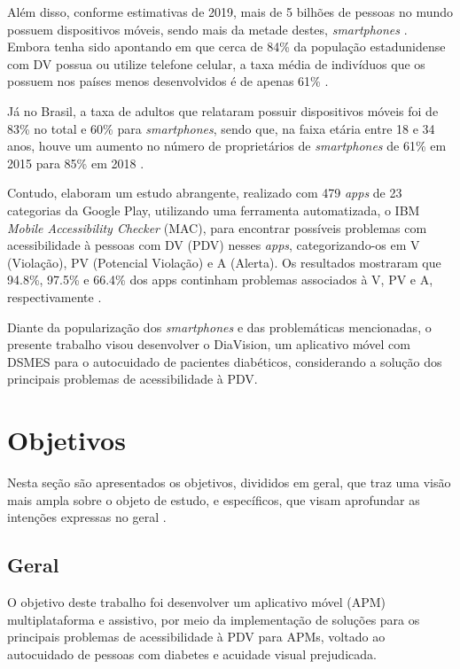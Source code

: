 Além disso, conforme estimativas de 2019, mais de 5 bilhões de pessoas no mundo possuem dispositivos móveis, sendo mais da metade destes, \textit{smartphones}
\cite{Taylor2019}. Embora tenha sido apontando em  que cerca de 84\% da população estadunidense com DV possua ou utilize
telefone celular, a taxa média de indivíduos que os possuem nos países menos desenvolvidos é de apenas 61\% \cite{ITU_2021}.

Já no Brasil, a taxa de adultos que relataram possuir dispositivos móveis foi de 83\% no total e 60\% para \textit{smartphones},
sendo que, na faixa etária entre 18 e 34 anos, houve um aumento no número de proprietários de \textit{smartphones} de
61\% em 2015 para 85\% em 2018 \cite{Taylor2019}.

Contudo,  elaboram um estudo abrangente, realizado com 479 \textit{apps} de 23 categorias da
Google Play, utilizando uma ferramenta automatizada, o IBM \textit{Mobile Accessibility Checker}
(MAC), para encontrar possíveis problemas com acessibilidade à pessoas com DV (PDV) nesses \textit{apps},
categorizando-os em V (Violação), PV (Potencial Violação) e A (Alerta). Os resultados mostraram que 94.8\%, 97.5\% e 66.4\% dos apps continham problemas
associados à V, PV e A, respectivamente \cite{Yan2019}.

Diante da popularização dos \emph{smartphones} e das problemáticas mencionadas, o presente trabalho visou desenvolver o DiaVision, um aplicativo móvel
com DSMES para o autocuidado de pacientes diabéticos, considerando a solução dos principais problemas de acessibilidade à PDV\@.

\section{Objetivos}

Nesta seção são apresentados os objetivos, divididos em geral, que traz uma visão mais ampla sobre o objeto
de estudo, e específicos, que visam aprofundar as intenções expressas no geral \cite{cervo2006metodologia}.

\subsection{Geral}

O objetivo deste trabalho foi desenvolver um aplicativo móvel (APM) multiplataforma e assistivo, por meio da implementação de soluções para os principais
problemas de acessibilidade à PDV para APMs, voltado ao autocuidado de pessoas com diabetes e acuidade visual prejudicada.

